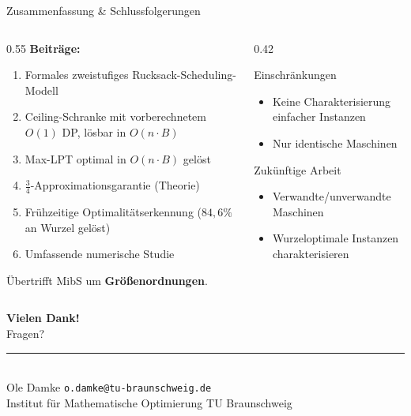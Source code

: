 \documentclass[fleqn,11pt,aspectratio=43]{beamer}
\begin{document}
\begin{frame}[shrink=5]{Zusammenfassung \& Schlussfolgerungen}
  \begin{columns}[T]
    \begin{column}{0.55\textwidth}
      \textbf{Beiträge:}
      \begin{enumerate}
        \item Formales zweistufiges Rucksack-Scheduling-Modell
        \item Ceiling-Schranke mit vorberechnetem $O(1)$ DP, lösbar in $O(n\cdot B)$
        \item Max-LPT optimal in $O(n\cdot B)$ gelöst
        \item $\tfrac34$-Approximationsgarantie (Theorie)
        \item Frühzeitige Optimalitätserkennung ($84{,}6\%$ an Wurzel gelöst)
        \item Umfassende numerische Studie
      \end{enumerate}
      \smallskip
      Übertrifft MibS um \textbf{Größenordnungen}.
    \end{column}
    \begin{column}{0.42\textwidth}
      \begin{alertblock}{Einschränkungen}
        \small
        \begin{itemize}
          \item Keine Charakterisierung einfacher Instanzen
          \item Nur identische Maschinen
        \end{itemize}
      \end{alertblock}
      \begin{block}{Zukünftige Arbeit}
        \small
        \begin{itemize}
          \item Verwandte/unverwandte Maschinen
          \item Wurzeloptimale Instanzen charakterisieren
        \end{itemize}
      \end{block}
    \end{column}
  \end{columns}
\end{frame}

\begin{frame}[plain]
  \begin{center}
    \vspace{3em}
    {\huge\bfseries Vielen Dank!}\\[0.8em]
    {\Large Fragen?}\\[1.6em]
    \rule{8cm}{0.4pt}\\[0.4em]
    {\small Ole Damke \;\textbullet\; \texttt{o.damke@tu-braunschweig.de}\\[0.2em]
           Institut für Mathematische Optimierung \;\textbullet\; TU Braunschweig}
  \end{center}
\end{frame}
\end{document}
